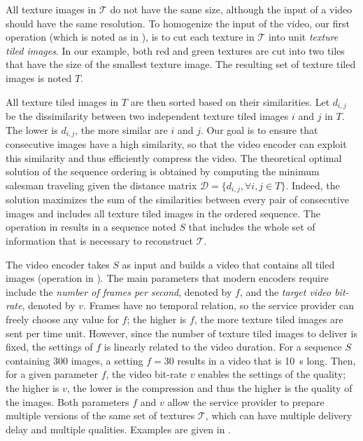 \documentclass{vgtc}                          %
\begin{document}
 All texture images in $\mathcal T$ do not have the same size, although the input of a video should have the same resolution. To homogenize the input of the video, our first operation (which is noted as  in ), is to cut each texture in $\mathcal T$ into unit \emph{texture tiled images}. In our example, both red and green textures are cut into two tiles that have the size of the smallest texture image. The resulting set of texture tiled images is noted $T$.

 All texture tiled images in $T$ are then sorted based on their similarities. Let $d_{i,j}$ be the dissimilarity between two independent texture tiled images $i$ and $j$ in $T$. The lower is $d_{i,j}$, the more similar are $i$ and $j$. Our goal is to ensure that consecutive images have a high similarity, so that the video encoder can exploit this similarity and thus efficiently compress the video. The theoretical optimal solution of the sequence ordering is obtained by computing the minimum salesman traveling given the distance matrix $\mathcal D= \{d_{i,j}, \forall i,j \in T\}$. Indeed, the solution maximizes the sum of the similarities between every pair of consecutive images and includes all texture tiled images in the ordered sequence. The operation  in  results in a sequence noted $S$ that includes the whole set of information that is necessary to reconstruct $\mathcal T$.

 The video encoder takes $S$ as input and builds a video that contains all tiled images (operation  in ). The main parameters that modern encoders require include the \emph{number of frames per second}, denoted by $f$, and the \emph{target video bit-rate}, denoted by $v$. Frames have no temporal relation, so the service provider can freely choose any value for $f$; the higher is $f$, the more texture tiled images are sent per time unit. However, since the number of texture tiled images to deliver is fixed, the settings of $f$ is linearly related to the video duration. For a sequence $S$ containing \num{300} images, a setting $f=30$ results in a video that is \SI{10}{\second} long. Then, for a given parameter $f$, the video bit-rate $v$ enables the settings of the quality; the higher is $v$, the lower is the compression and thus the higher is the quality of the images. Both parameters $f$ and $v$ allow the service provider to prepare multiple versions of the same set of textures $\mathcal T$, which can have multiple delivery delay and multiple qualities. Examples are given in . 
\end{document}
